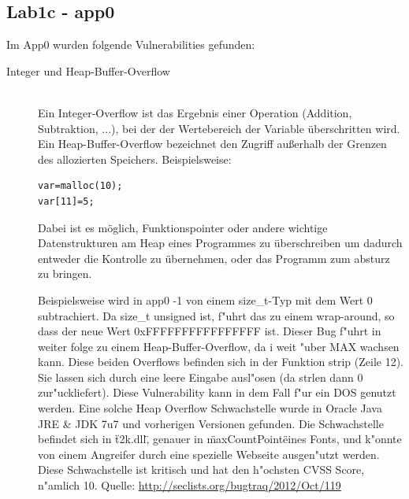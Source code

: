 \documentclass[12pt,a4paper,titlepage,oneside]{scrartcl}
\begin{document}
\subsection{Lab1c - app0}
Im App0 wurden folgende Vulnerabilities gefunden:
\begin{description}
  \item[Integer und Heap-Buffer-Overflow] \hfill \\
  	 Ein Integer-Overflow ist das Ergebnis einer Operation (Addition, Subtraktion, ...), bei der der Wertebereich der Variable überschritten wird.\newline
  	 Ein Heap-Buffer-Overflow bezeichnet den Zugriff außerhalb der Grenzen des allozierten Speichers. Beispielsweise:
  	 \begin{lstlisting}
var=malloc(10);
var[11]=5;
	\end{lstlisting}
	Dabei ist es möglich, Funktionspointer oder andere wichtige Datenstrukturen am Heap eines Programmes zu überschreiben um dadurch entweder die Kontrolle zu übernehmen, oder das Programm zum absturz zu bringen.
	
  	 Beispielsweise wird in app0 -1 von einem size\_t-Typ mit dem Wert 0 subtrachiert. Da size\_t unsigned ist, f"uhrt das zu einem wrap-around, so dass der neue Wert 0xFFFFFFFFFFFFFFFF ist. \newline
    Dieser Bug f"uhrt in weiter folge zu einem Heap-Buffer-Overflow, da i weit "uber MAX wachsen kann.\newline
    Diese beiden Overflows befinden sich in der Funktion strip (Zeile 12). Sie lassen sich durch eine leere Eingabe ausl"osen (da strlen dann 0 zur"uckliefert).
    Diese Vulnerability kann in dem Fall f"ur ein DOS genutzt werden.
    Eine solche Heap Overflow Schwachstelle wurde in Oracle Java JRE \& JDK 7u7 und vorherigen Versionen gefunden. Die Schwachstelle befindet sich in \"t2k.dll\", genauer in \"maxCountPoint\" eines Fonts, und k"onnte von einem Angreifer durch eine spezielle Webseite ausgen"utzt werden. Diese Schwachstelle ist kritisch und hat den h"ochsten CVSS Score, n"amlich 10.\newline
    Quelle: \url{http://seclists.org/bugtraq/2012/Oct/119}
    

\end{description}
\end{document}
